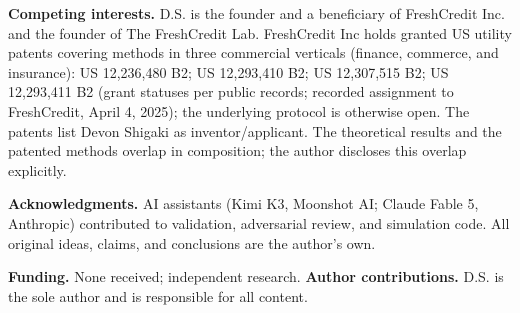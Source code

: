 \documentclass[11pt,twocolumn]{article}
\theoremstyle{plain}
\begin{document}
\textbf{Competing interests.} D.S. is the founder and a beneficiary of FreshCredit Inc. and the founder of The FreshCredit Lab. FreshCredit Inc holds granted US utility patents covering methods in three commercial verticals (finance, commerce, and insurance): US 12,236,480 B2; US 12,293,410 B2; US 12,307,515 B2; US 12,293,411 B2 (grant statuses per public records; recorded assignment to FreshCredit, April 4, 2025); the underlying protocol is otherwise open. The patents list Devon Shigaki as inventor/applicant. The theoretical results and the patented methods overlap in composition; the author discloses this overlap explicitly.

\textbf{Acknowledgments.} AI assistants (Kimi K3, Moonshot AI; Claude Fable 5, Anthropic) contributed to validation, adversarial review, and simulation code. All original ideas, claims, and conclusions are the author's own.

\textbf{Funding.} None received; independent research. \textbf{Author contributions.} D.S. is the sole author and is responsible for all content.

\nocite{*}


\end{document}
